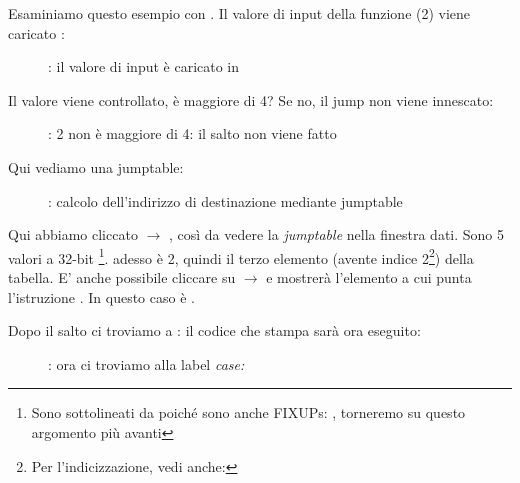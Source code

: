 \clearpage
\mysubparagraph{\olly}
\myindex{\olly}

Esaminiamo questo esempio con \olly.
Il valore di input della funzione (2) viene caricato \EAX: 

\begin{figure}[H]
\centering
{}
\caption{\olly: il valore di input è caricato in \EAX}
\label{fig:switch_lot_olly1}
\end{figure}

\clearpage
Il valore viene controllato, è maggiore di 4?
Se no, il  jump non viene innescato:
\begin{figure}[H]
\centering
{}
\caption{\olly: 2 non è maggiore di 4: il salto non viene fatto}
\label{fig:switch_lot_olly2}
\end{figure}

\clearpage
Qui vediamo una jumptable:

\begin{figure}[H]
\centering
{}
\caption{\olly: calcolo dell'indirizzo di destinazione mediante jumptable}
\label{fig:switch_lot_olly3}
\end{figure}

Qui abbiamo cliccato  $\rightarrow$ , così da vedere la \emph{jumptable} nella finestra dati.
Sono 5 valori a 32-bit \footnote{Sono sottolineati da \olly poiché
sono anche FIXUPs: , torneremo su questo argomento più avanti}.
\ECX adesso è 2, quindi il terzo elemento (avente indice 2\footnote{Per l'indicizzazione, vedi anche: }) della tabella.
E' anche possibile cliccare su  $\rightarrow$ 
 e \olly mostrerà l'elemento a cui punta l'istruzione \JMP. 
In questo caso è .

\clearpage
Dopo il salto ci troviamo a : il codice che stampa  sarà ora eseguito:

\begin{figure}[H]
\centering
{}
\caption{\olly: ora ci troviamo alla label \emph{case:}}
\label{fig:switch_lot_olly4}
\end{figure}

